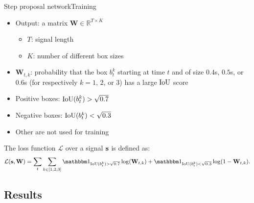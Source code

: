 \begin{frame}{Step proposal network}{Training}
\begin{itemize}
    \item Output: a matrix $\mathbf{W} \in \mathbb{R}^{T \times K}$
    \begin{itemize}
        \item $T$: signal length
        \item $K$: number of different box sizes
    \end{itemize}

    \item $\mathbf{W}_{t,k}$: probability that the box $b_t^k$ starting at time $t$ and of size $0.4$s, $0.5$s, or $0.6$s (for respectively $k=1$, $2$, or $3$) has a large $\mathrm{IoU}$ score
    \item Positive boxes: $\mathrm{IoU}(b_t^{k}) > \sqrt{0.7}$
    \item Negative boxes: $\mathrm{IoU}(b_t^{k}) < \sqrt{0.3}$
    \item Other are not used for training
\end{itemize}

\vspace{0.8cm}

The loss function $\mathcal{L}$ over a signal $\mathbf{s}$ is defined as:
\begin{equation*}\label{eq: loss training CNN}
\mathcal{L}(\bfs, \mathbf{W}) = \sum_{t} \sum_{k \in \left[1, 2, 3 \right]} \bbmind_{ \iou(b_t^{k})> \sqrt{0.7} } \log(\mathbf{W}_{t,k}) + \bbmind_{ \iou(b_t^{k})< \sqrt{0.3} } \log(1-\mathbf{W}_{t,k}). 
\end{equation*}
\end{frame}

\subsection{Results}



